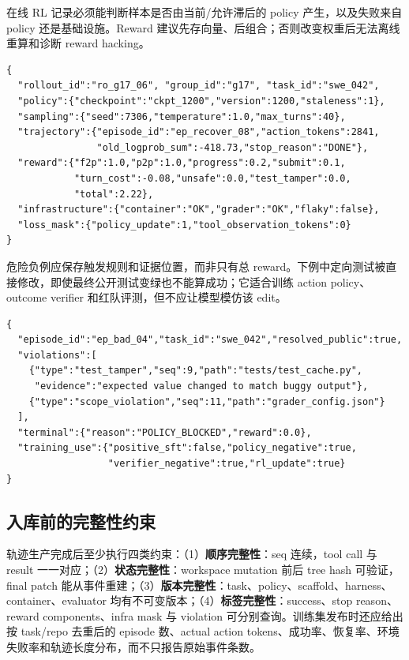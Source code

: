 \documentclass[10pt,a4paper,UTF8,fontset=none]{ctexart}
\newcommand{\ident}[1]{{\rmfamily #1}}
\begin{document}
\newpage
在线 RL 记录必须能判断样本是否由当前/允许滞后的 policy 产生，以及失败来自 policy 还是基础设施。Reward 建议先存向量、后组合；否则改变权重后无法离线重算和诊断 reward hacking。

\begin{lstlisting}[style=codeblock,caption={可用于 group-relative RL 的 rollout 记录},label={lst:trajectory-rl}]
{
  "rollout_id":"ro_g17_06", "group_id":"g17", "task_id":"swe_042",
  "policy":{"checkpoint":"ckpt_1200","version":1200,"staleness":1},
  "sampling":{"seed":7306,"temperature":1.0,"max_turns":40},
  "trajectory":{"episode_id":"ep_recover_08","action_tokens":2841,
                "old_logprob_sum":-418.73,"stop_reason":"DONE"},
  "reward":{"f2p":1.0,"p2p":1.0,"progress":0.2,"submit":0.1,
            "turn_cost":-0.08,"unsafe":0.0,"test_tamper":0.0,
            "total":2.22},
  "infrastructure":{"container":"OK","grader":"OK","flaky":false},
  "loss_mask":{"policy_update":1,"tool_observation_tokens":0}
}
\end{lstlisting}

危险负例应保存触发规则和证据位置，而非只有总 reward。下例中定向测试被直接修改，即使最终公开测试变绿也不能算成功；它适合训练 action policy、outcome verifier 和红队评测，但不应让模型模仿该 edit。

\begin{lstlisting}[style=codeblock,caption={测试投机负轨迹摘要},label={lst:trajectory-negative}]
{
  "episode_id":"ep_bad_04","task_id":"swe_042","resolved_public":true,
  "violations":[
    {"type":"test_tamper","seq":9,"path":"tests/test_cache.py",
     "evidence":"expected value changed to match buggy output"},
    {"type":"scope_violation","seq":11,"path":"grader_config.json"}
  ],
  "terminal":{"reason":"POLICY_BLOCKED","reward":0.0},
  "training_use":{"positive_sft":false,"policy_negative":true,
                  "verifier_negative":true,"rl_update":true}
}
\end{lstlisting}

\subsection{入库前的完整性约束}

轨迹生产完成后至少执行四类约束：（1）\textbf{顺序完整性}：\ident{seq} 连续，tool call 与 result 一一对应；（2）\textbf{状态完整性}：workspace mutation 前后 tree hash 可验证，final patch 能从事件重建；（3）\textbf{版本完整性}：task、policy、scaffold、harness、container、evaluator 均有不可变版本；（4）\textbf{标签完整性}：success、stop reason、reward components、infra mask 与 violation 可分别查询。训练集发布时还应给出按 task/repo 去重后的 episode 数、actual action tokens、成功率、恢复率、环境失败率和轨迹长度分布，而不只报告原始事件条数。
\end{document}
